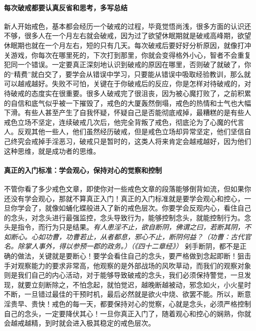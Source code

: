 \paragraph{每次破戒都要认真反省和思考，多写总结}

新人开始戒色，基本都会经历一个破戒的过程，毕竟觉悟尚浅，很多方面的认识还不够，很多人在一个月左右就会破戒，因为过了欲望休眠期就是破戒高峰期，欲望休眠期也就在一个月左右，短的只有几天。每次破戒后要好好分析原因，就像打冲关游戏，你每次在哪里死的，下次打到那里，你就会变得格外小心，智者不会重复犯同一个错误。一定要真正深刻地认识到破戒的原因在哪里，否则破了就破了，你的“精费”就白交了，要学会从错误中学习，只要能从错误中吸取经验教训，那么就可以越戒越好。失败不可怕，关键在于你破戒后的反应，你是怎样对待破戒的，对待破戒的态度实在很重要。很多人破戒完了很沮丧，因为被心魔打败了，之前积累的自信和底气似乎被一下摧毁了，戒色的大厦轰然倒塌，戒色的热情和士气也大幅下滑。有些人甚至产生了自我怀疑，怀疑自己是否能彻底戒掉，最糟糕的是有些人戒色立场不坚定，连续破戒几次后，他完全背叛了戒色，彻底沦为了心魔的代言人。反观其他一些人，他们虽然经历破戒，但是戒色立场却异常坚定，他们坚信自己终究会戒掉手淫恶习，破戒只是暂时的，这类人将来肯定会越戒越好，因为他们这种思维，就是成功者的思维。

\paragraph{真正的入门标准：学会观心，保持对心的觉察和控制}

不管你看了多少戒色文章，即使你对一些戒色文章的段落能够倒背如流，但如果你还没有学会观心，那就不算真正入门！真正的入门标准就是要学会观心和控心，一旦你学会了，就像如蛹化蝶般进入了新的戒色层次。你要学会反观内心，看住自己的念头，对念头进行最强监控，念头导致行为，能够控制念头，就能控制行为。念头是指令，而行为只是结果。\textit{有人患淫不止，欲自断阴，佛谓之曰，若断其阴，不如断心。心如功曹，功曹若止，从者都息，邪心不止，断阴何益？（功曹：古代官名。除掌人事外，得以参预一郡的政务。）（《四十二章经》）} 剁手断阴，都不是正确的做法，关键就是要断心！要学会看住自己的念头，要严格做到念起即断！狙击手对观察能力的要求非常高，他观察的是外部战场的风吹草动，而我们的观察对象则是我们自己的内心活动，对于能够导致破戒的念头，我们必须保持警觉，一旦发现，就要立刻断除之，不怕念起，就怕觉迟，越晚断越被动，邪念如火，小火星时不断，一旦错过最佳的干预时机，最后必然就是欲火中烧、欲罢不能。所以，断意淫贵早、贵快！戒色的每一天，都要保持对心的觉察，心就是念头，必须严格控制自己的念头，一定要降伏其心！一旦你真正入门了，随着观心和控心的娴熟，你就会越戒越精，到时就会进入极其稳定的戒色层次。

